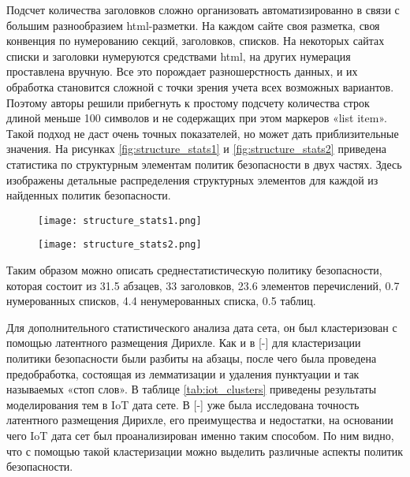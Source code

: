 \documentclass[../main]{subfiles}
\begin{document}
Подсчет количества заголовков сложно организовать автоматизированно в связи с большим разнообразием html-разметки. На каждом сайте своя разметка, своя конвенция по нумерованию секций, заголовков, списков. На некоторых сайтах списки и заголовки нумеруются средствами html, на других нумерация проставлена вручную. Все это порождает разношерстность данных, и их обработка становится сложной с точки зрения учета всех возможных вариантов. Поэтому авторы решили прибегнуть к простому подсчету количества строк длиной меньше 100 символов и не содержащих при этом маркеров «{list item}». Такой подход не даст очень точных показателей, но может дать приблизительные значения. На рисунках \ref{fig:structure_stats1} и \ref{fig:structure_stats2} приведена статистика по структурным элементам политик безопасности в двух частях. Здесь изображены детальные распределения структурных элементов для каждой из найденных политик безопасности.

\begin{figure}[H]
    \centering
    {\texttt{[image: structure\_stats1.png]}}
    \vspace{-\baselineskip}
\end{figure}

\begin{figure}[H]
    \centering
    {\texttt{[image: structure\_stats2.png]}}
    \vspace{-\baselineskip}
\end{figure}

Таким образом можно описать среднестатистическую политику безопасности, которая состоит из 31.5 абзацев, 33 заголовков, 23.6 элементов перечислений, 0.7 нумерованных списков, 4.4 ненумерованных списка, 0.5 таблиц.

Для дополнительного статистического анализа дата сета, он был кластеризован с помощью латентного размещения Дирихле. Как и в [-] для кластеризации политики безопасности были разбиты на абзацы, после чего была проведена предобработка, состоящая из лемматизации и удаления пунктуации и так называемых «стоп слов». В таблице \ref{tab:iot_clusters} приведены результаты моделирования тем в IoT дата сете. В [-] уже была исследована точность латентного размещения Дирихле, его преимущества и недостатки, на основании чего IoT дата сет был проанализирован именно таким способом.  По ним видно, что с помощью такой кластеризации можно выделить различные аспекты политик безопасности.
\end{document}
